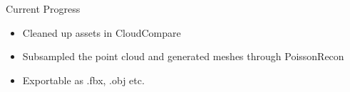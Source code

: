 





\begin{frame}{Current Progress}
     \begin{itemize}
        \item Cleaned up assets in CloudCompare
        \item Subsampled the point cloud and generated meshes through PoissonRecon
        \item Exportable as .fbx, .obj etc.
    \end{itemize}    
\end{frame}

